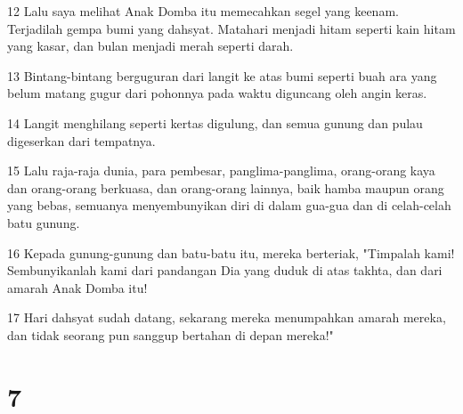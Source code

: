 \par 12 Lalu saya melihat Anak Domba itu memecahkan segel yang keenam. Terjadilah gempa bumi yang dahsyat. Matahari menjadi hitam seperti kain hitam yang kasar, dan bulan menjadi merah seperti darah.
\par 13 Bintang-bintang berguguran dari langit ke atas bumi seperti buah ara yang belum matang gugur dari pohonnya pada waktu diguncang oleh angin keras.
\par 14 Langit menghilang seperti kertas digulung, dan semua gunung dan pulau digeserkan dari tempatnya.
\par 15 Lalu raja-raja dunia, para pembesar, panglima-panglima, orang-orang kaya dan orang-orang berkuasa, dan orang-orang lainnya, baik hamba maupun orang yang bebas, semuanya menyembunyikan diri di dalam gua-gua dan di celah-celah batu gunung.
\par 16 Kepada gunung-gunung dan batu-batu itu, mereka berteriak, "Timpalah kami! Sembunyikanlah kami dari pandangan Dia yang duduk di atas takhta, dan dari amarah Anak Domba itu!
\par 17 Hari dahsyat sudah datang, sekarang mereka menumpahkan amarah mereka, dan tidak seorang pun sanggup bertahan di depan mereka!"

\chapter{7}

